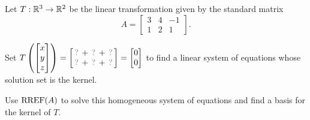 \begin{applicationActivities}
\begin{activity}{10}
Let $T: \mathbb{R}^3 \rightarrow \mathbb{R}^2$ be the linear transformation given by the
standard matrix
\[A=\begin{bmatrix} 3 & 4 & -1 \\ 1 & 2 & 1 \end{bmatrix}.\]
\begin{subactivity}
Set
\(
  T\left(\begin{bmatrix}x\\y\\z\end{bmatrix}\right)
    =
  \begin{bmatrix}
    \unknown+\unknown+\unknown \\
    \unknown+\unknown+\unknown
  \end{bmatrix}
    =
  \begin{bmatrix}0\\0\end{bmatrix}
\) to find a linear system of equations whose solution set is the kernel.
\end{subactivity}
\begin{subactivity}
Use $\operatorname{RREF}(A)$ to solve this homogeneous system of equations and find a basis
for the kernel of \(T\).
\end{subactivity}
\end{activity}



\end{applicationActivities}
